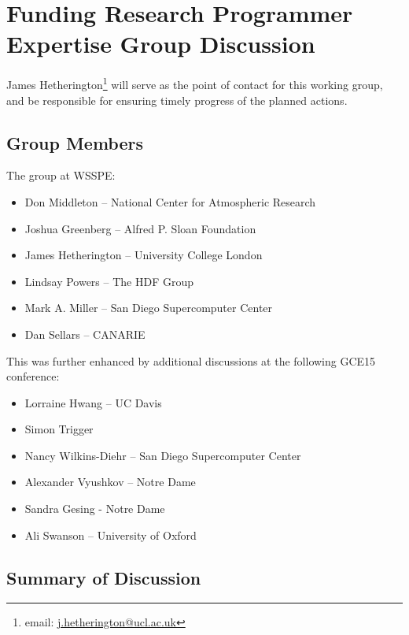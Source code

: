 \section{Funding Research Programmer Expertise Group Discussion}
\label{sec:appendix_funding_spec_expert}

James Hetherington\footnote{email: \href{mailto:j.hetherington@ucl.ac.uk}{j.hetherington@ucl.ac.uk}}
will serve as the point of contact for this working group, and be responsible for ensuring timely progress of the planned actions.

\subsection{Group Members}

The group at WSSPE:

\begin{itemize}
\item Don Middleton -- National Center for Atmospheric Research
\item Joshua Greenberg -- Alfred P. Sloan Foundation
\item James Hetherington -- University College London
\item Lindsay Powers -- The HDF Group
\item Mark A. Miller -- San Diego Supercomputer Center
\item Dan Sellars -- CANARIE
\end{itemize}

This was further enhanced by additional discussions at the following
GCE15 conference:
  
\begin{itemize}
\item Lorraine Hwang -- UC Davis
\item Simon Trigger
\item Nancy Wilkins-Diehr -- San Diego Supercomputer Center
\item Alexander Vyushkov -- Notre Dame
\item Sandra Gesing - Notre Dame
\item Ali Swanson -- University of Oxford

\end{itemize}

\subsection{Summary of Discussion}

